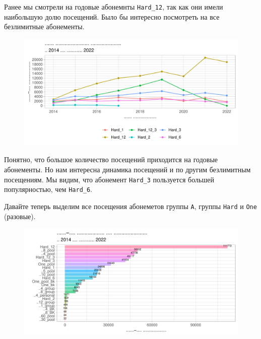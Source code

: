 \documentclass[
  letterpaper,
  DIV=11,
  numbers=noendperiod]{scrartcl}
\begin{document}
Ранее мы смотрели на годовые абонемнты \texttt{Hard\_12}, так как они
имели наибольшую долю посещений. Было бы интересно посмотреть на все
безлимитные абонементы.

\begin{figure}

{\centering \includegraphics{./intro_files/figure-pdf/unnamed-chunk-14-1.pdf}

}

\end{figure}

Понятно, что большое количество посещений приходится на годовые
абонементы. Но нам интересна динамика посещений и по другим безлимитным
посещениям. Мы видим, что абонемент \texttt{Hard\_3} пользуется большей
популярностью, чем \texttt{Hard\_6}.

Давайте теперь выделим все посещения абонеметов группы \texttt{А},
группы \texttt{Hard} и \texttt{One} (разовые).

\begin{figure}

{\centering \includegraphics{./intro_files/figure-pdf/unnamed-chunk-15-1.pdf}

}

\end{figure}
\end{document}
